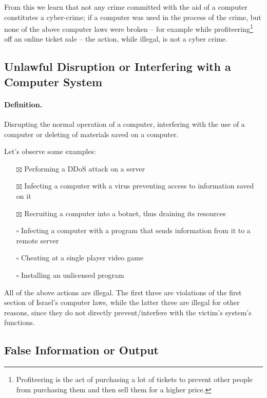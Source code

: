 From this we learn that not any crime committed with the aid of a computer
constitutes a cyber-crime; if a computer was used in the process of the crime,
but none of the above computer laws were broken -- for example while
profiteering\footnote{Profiteering is the act of purchasing a lot of tickets to
prevent other people from purchasing them and then sell them for a higher
price.} off an online ticket sale -- the action, while illegal, is not a cyber
crime.


\subsection{Unlawful Disruption or Interfering with a Computer System}

\paragraph{Definition.} Disrupting the normal operation of a computer,
interfering with the use of a computer or deleting of materials saved on a
computer.

Let's observe some examples:
\begin{itemize}
    \item[$\boxtimes$] Performing a DDoS attack on a server
    \item[$\boxtimes$] Infecting a computer with a virus preventing access to
    information saved on it
    \item[$\boxtimes$] Recruiting a computer into a botnet, thus draining its
    resources
    \item[$\square$] Infecting a computer with a program that sends information
    from it to a remote server
    \item[$\square$] Cheating at a single player video game
    \item[$\square$] Installing an unlicensed program
\end{itemize}

All of the above actions are illegal. The first three are violations of the
first section of Israel's computer laws, while the latter three are illegal for
other reasons, since they do not directly prevent/interfere with the victim's
system's functions.

\subsection{False Information or Output}


